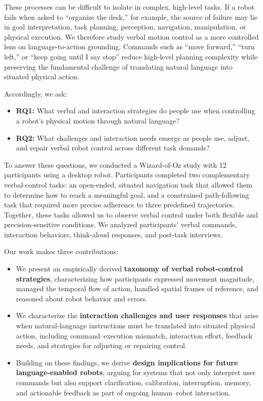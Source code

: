 These processes can be difficult to isolate in complex, high-level tasks. If a robot fails when asked to ``organize the desk,'' for example, the source of failure may lie in goal interpretation, task planning, perception, navigation, manipulation, or physical execution. We therefore study verbal motion control as a more controlled lens on language-to-action grounding. Commands such as ``move forward,'' ``turn left,'' or ``keep going until I say stop'' reduce high-level planning complexity while preserving the fundamental challenge of translating natural language into situated physical action. \citep{marge2010routes, marge2015recovery, fong2003questions}

Accordingly, we ask:

\begin{itemize}
    \item \textbf{RQ1:} What verbal and interaction strategies do people use when controlling a robot's physical motion through natural language?
    \item \textbf{RQ2:} What challenges and interaction needs emerge as people use, adjust, and repair verbal robot control across different task demands?
\end{itemize}

To answer these questions, we conducted a Wizard-of-Oz study with 12 participants using a desktop robot. Participants completed two complementary verbal-control tasks: an open-ended, situated navigation task that allowed them to determine how to reach a meaningful goal, and a constrained path-following task that required more precise adherence to three predefined trajectories. Together, these tasks allowed us to observe verbal control under both flexible and precision-sensitive conditions. We analyzed participants' verbal commands, interaction behaviors, think-aloud responses, and post-task interviews.

Our work makes three contributions:

\begin{itemize}
    \item We present an empirically derived \textbf{taxonomy of verbal robot-control strategies}, characterizing how participants expressed movement magnitude, managed the temporal flow of action, handled spatial frames of reference, and reasoned about robot behavior and errors.
    
    \item We characterize the \textbf{interaction challenges and user responses} that arise when natural-language instructions must be translated into situated physical action, including command--execution mismatch, interaction effort, feedback needs, and strategies for adjusting or repairing control.
    
    \item Building on these findings, we derive \textbf{design implications for future language-enabled robots}, arguing for systems that not only interpret user commands but also support clarification, calibration, interruption, memory, and actionable feedback as part of ongoing human--robot interaction.
\end{itemize}
